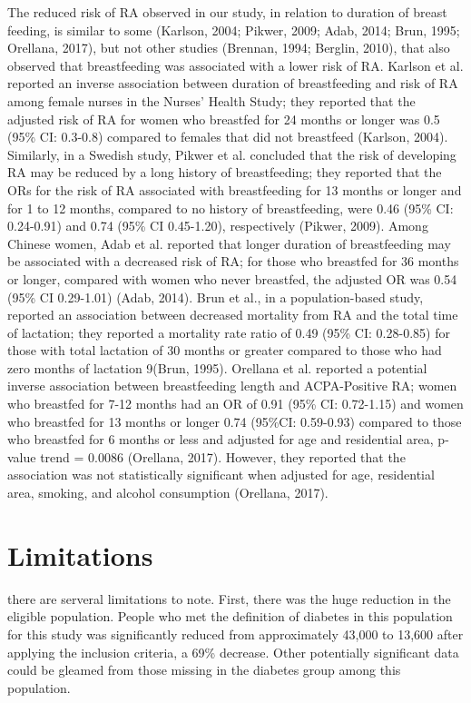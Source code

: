 \documentclass [11pt, proquest] {uwthesis}[2015/03/03]
\begin{document}
The reduced risk of RA observed in our study, in relation to duration of
breast feeding, is similar to some (Karlson, 2004; Pikwer, 2009; Adab,
2014; Brun, 1995; Orellana, 2017), but not other studies (Brennan, 1994;
Berglin, 2010), that also observed that breastfeeding was associated
with a lower risk of RA. Karlson et al. reported an inverse association
between duration of breastfeeding and risk of RA among female nurses in
the Nurses' Health Study; they reported that the adjusted risk of RA for
women who breastfed for 24 months or longer was 0.5 (95\% CI: 0.3-0.8)
compared to females that did not breastfeed (Karlson, 2004). Similarly,
in a Swedish study, Pikwer et al. concluded that the risk of developing
RA may be reduced by a long history of breastfeeding; they reported that
the ORs for the risk of RA associated with breastfeeding for 13 months
or longer and for 1 to 12 months, compared to no history of
breastfeeding, were 0.46 (95\% CI: 0.24-0.91) and 0.74 (95\% CI
0.45-1.20), respectively (Pikwer, 2009). Among Chinese women, Adab et
al. reported that longer duration of breastfeeding may be associated
with a decreased risk of RA; for those who breastfed for 36 months or
longer, compared with women who never breastfed, the adjusted OR was
0.54 (95\% CI 0.29-1.01) (Adab, 2014). Brun et al., in a
population-based study, reported an association between decreased
mortality from RA and the total time of lactation; they reported a
mortality rate ratio of 0.49 (95\% CI: 0.28-0.85) for those with total
lactation of 30 months or greater compared to those who had zero months
of lactation 9(Brun, 1995). Orellana et al. reported a potential inverse
association between breastfeeding length and ACPA-Positive RA; women who
breastfed for 7-12 months had an OR of 0.91 (95\% CI: 0.72-1.15) and
women who breastfed for 13 months or longer 0.74 (95\%CI: 0.59-0.93)
compared to those who breastfed for 6 months or less and adjusted for
age and residential area, p-value trend = 0.0086 (Orellana, 2017).
However, they reported that the association was not statistically
significant when adjusted for age, residential area, smoking, and
alcohol consumption (Orellana, 2017).

\section{Limitations}\label{limitations}

there are serveral limitations to note. First, there was the huge
reduction in the eligible population. People who met the definition of
diabetes in this population for this study was significantly reduced
from approximately 43,000 to 13,600 after applying the inclusion
criteria, a 69\% decrease. Other potentially significant data could be
gleamed from those missing in the diabetes group among this population.
\end{document}
